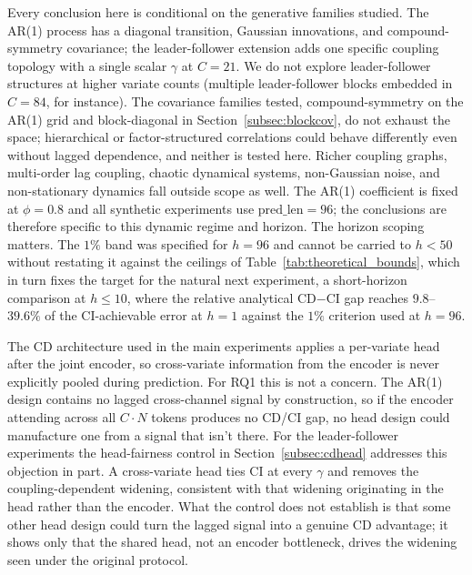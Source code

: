 \documentclass[10pt]{article} %
\begin{document}
    Every conclusion here is conditional on the generative families studied. The AR(1) process has a diagonal transition,
    Gaussian innovations, and compound-symmetry covariance; the leader-follower extension adds one specific coupling
    topology with a single scalar $\gamma$ at $C = 21$. We do not explore leader-follower structures at higher variate
    counts (multiple leader-follower blocks embedded in $C = 84$, for instance). The covariance families tested,
    compound-symmetry on the AR(1) grid and block-diagonal in Section~\ref{subsec:blockcov}, do not exhaust the space;
    hierarchical or factor-structured correlations could behave differently even without lagged dependence, and neither
    is tested here. Richer coupling graphs, multi-order lag coupling, chaotic dynamical systems, non-Gaussian noise, and
    non-stationary dynamics fall outside scope as well.
    The AR(1) coefficient is fixed at $\phi = 0.8$ and all synthetic experiments use $\text{pred\_len} = 96$; the conclusions
    are therefore specific to this dynamic regime and horizon. The horizon scoping matters. The $1\%$ band was specified
    for $h = 96$ and cannot be carried to $h < 50$ without restating it against the ceilings of Table~\ref{tab:theoretical_bounds},
    which in turn fixes the target for the natural next experiment, a short-horizon comparison at $h \le 10$, where the
    relative analytical CD$-$CI gap reaches $9.8$--$39.6\%$ of the CI-achievable error at $h = 1$ against the $1\%$ criterion
    used at $h = 96$.

    The CD architecture used in the main experiments applies a per-variate head after the joint encoder, so cross-variate
    information from the encoder is never explicitly pooled during prediction. For RQ1 this is not a concern. The AR(1) design
    contains no lagged cross-channel signal by construction, so if the encoder attending across all $C \cdot N$ tokens
    produces no CD/CI gap, no head design could manufacture one from a signal that isn't there. For the leader-follower
    experiments the head-fairness control in Section~\ref{subsec:cdhead} addresses this objection in part. A cross-variate
    head ties CI at every $\gamma$ and removes the coupling-dependent widening, consistent with that widening originating in
    the head rather than the encoder. What the control does not establish is that some other head design could turn the lagged
    signal into a genuine CD advantage; it shows only that the shared head, not an encoder bottleneck, drives the widening
    seen under the original protocol.
\end{document}
